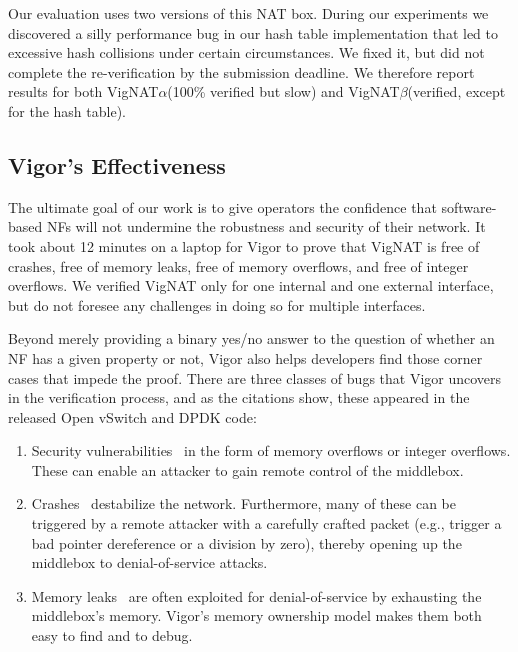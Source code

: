 \documentclass[letterpaper,twocolumn,10pt]{article}
\newcommand{\vignat}{{\sc VigNAT}\xspace}
\newcommand{\vignata}{{\sc VigNAT$\alpha$}\xspace}
\newcommand{\vignatb}{{\sc VigNAT$\beta$}\xspace}
\begin{document}
{Our evaluation uses two versions of this NAT box. During our experiments we discovered a silly performance bug in our hash table implementation that led to excessive hash collisions under certain circumstances. We fixed it, but did not complete the re-verification by the submission deadline. We therefore report results for both \vignata (100\% verified but slow) and \vignatb (verified, except for the hash table).

\subsection{Vigor's Effectiveness}
\label{sec:effectiveness}

The ultimate goal of our work is to give operators the confidence that software-based NFs will not undermine the robustness and security of their network. It took about 12 minutes on a laptop for Vigor to prove that \vignat is free of crashes, free of memory leaks, free of memory overflows, and free of integer overflows. We verified \vignat only for one internal and one external interface, but do not foresee any challenges in doing so for multiple interfaces. 

Beyond merely providing a binary yes/no answer to the question of whether an NF has a given property or not, Vigor also helps developers find those corner cases that impede the proof. There are three classes of bugs that Vigor uncovers in the verification process, and as the citations show, these appeared in the released Open vSwitch and DPDK code:
\begin{enumerate}

    \item Security vulnerabilities~\cite{bug:ovs-uaf, bug:dpdk-uaf1, bug:dpdk-uaf2, bug:ovs-faf, bug:ovs-overflow, bug:dpdk-overflow1, bug:dpdk-overflow2, bug:ovs-int-overflow, bug:dpdk-int-overflow} in the form of memory overflows or integer overflows. These can enable an attacker to gain remote control of the middlebox.
    
    \item Crashes~\cite{bug:ovs-0ptr, bug:dpdk-0ptr1, bug:dpdk-0ptr2, bug:dpdk-0ptr3} destabilize the network. Furthermore, many of these can be triggered by a remote attacker with a carefully crafted packet (e.g., trigger a bad pointer dereference or a division by zero), thereby opening up the middlebox to denial-of-service attacks.

    \item Memory leaks~\cite{bug:ovs-mem-leak1, bug:ovs-mem-leak2, bug:ovs-mem-leak3, bug:ovs-mem-leak4, bug:dpdk-mem-leak1, bug:dpdk-mem-leak2} are often exploited for denial-of-service by exhausting the middlebox's memory. Vigor's memory ownership model makes them both easy to find and to debug.


\end{enumerate}}
\end{document}
